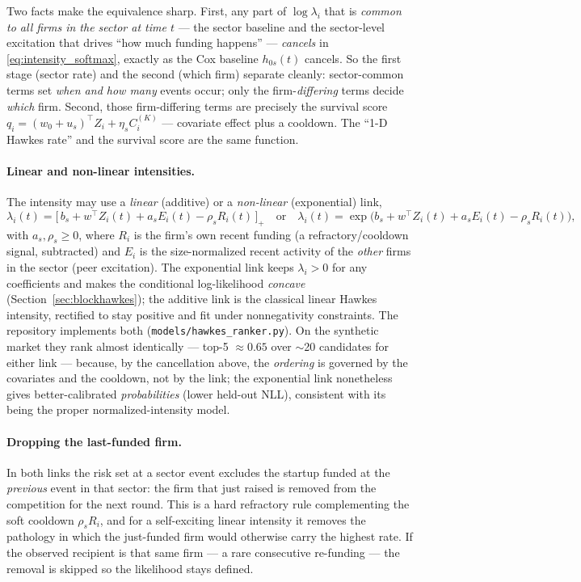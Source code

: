 \documentclass[11pt]{article}
\theoremstyle{plain}
\theoremstyle{definition}
\theoremstyle{remark}
\newcommand{\code}[1]{\texttt{#1}}
\begin{document}
Two facts make the equivalence sharp. First, any part of $\log\lambda_i$ that is \emph{common to all firms in the sector at time $t$} --- the sector baseline and the sector-level excitation that drives ``how much funding happens'' --- \emph{cancels} in \eqref{eq:intensity_softmax}, exactly as the Cox baseline $h_{0s}(t)$ cancels. So the first stage (sector rate) and the second (which firm) separate cleanly: sector-common terms set \emph{when and how many} events occur; only the firm-\emph{differing} terms decide \emph{which} firm. Second, those firm-differing terms are precisely the survival score $q_i=(w_0+u_s)^\top Z_i+\eta_s C^{(K)}_i$ --- covariate effect plus a cooldown. The ``1-D Hawkes rate'' and the survival score are the same function.

\paragraph{Linear and non-linear intensities.}
The intensity may use a \emph{linear} (additive) or a \emph{non-linear} (exponential) link,
\begin{equation}
\lambda_i(t)=\big[\,b_s+w^\top Z_i(t)+a_s E_i(t)-\rho_s R_i(t)\,\big]_+
\quad\text{or}\quad
\lambda_i(t)=\exp\!\big(b_s+w^\top Z_i(t)+a_s E_i(t)-\rho_s R_i(t)\big),
\label{eq:two_links}
\end{equation}
with $a_s,\rho_s\ge0$, where $R_i$ is the firm's own recent funding (a refractory/cooldown signal, subtracted) and $E_i$ is the size-normalized recent activity of the \emph{other} firms in the sector (peer excitation). The exponential link keeps $\lambda_i>0$ for any coefficients and makes the conditional log-likelihood \emph{concave} (Section~\ref{sec:blockhawkes}); the additive link is the classical linear Hawkes intensity, rectified to stay positive and fit under nonnegativity constraints. The repository implements both (\code{models/hawkes\_ranker.py}). On the synthetic market they rank almost identically --- top-5 $\approx0.65$ over $\sim$20 candidates for either link --- because, by the cancellation above, the \emph{ordering} is governed by the covariates and the cooldown, not by the link; the exponential link nonetheless gives better-calibrated \emph{probabilities} (lower held-out NLL), consistent with its being the proper normalized-intensity model.

\paragraph{Dropping the last-funded firm.}
In both links the risk set at a sector event excludes the startup funded at the \emph{previous} event in that sector: the firm that just raised is removed from the competition for the next round. This is a hard refractory rule complementing the soft cooldown $\rho_s R_i$, and for a self-exciting linear intensity it removes the pathology in which the just-funded firm would otherwise carry the highest rate. If the observed recipient is that same firm --- a rare consecutive re-funding --- the removal is skipped so the likelihood stays defined.
\end{document}
